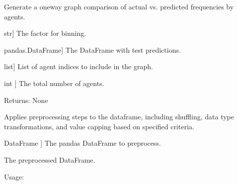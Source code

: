 \documentclass[letterpaper,10pt,english]{sphinxmanual}
\begin{document}
\begin{fulllineitems}
\label{\detokenize{utils:utils.one_way_graph_comparison}}
\pysigstartsignatures
{}
\pysigstopsignatures
\sphinxAtStartPar
Generate a one\sphinxhyphen{}way graph comparison of actual vs. predicted frequencies by agents.
\begin{description}
\begin{description}
\sphinxlineitem{factor}{[}str{]}
\sphinxAtStartPar
The factor for binning.

\sphinxlineitem{df\_test\_pred}{[}pandas.DataFrame{]}
\sphinxAtStartPar
The DataFrame with test predictions.

\sphinxlineitem{agents\_to\_graph\_list}{[}list{]}
\sphinxAtStartPar
List of agent indices to include in the graph.

\sphinxlineitem{NUM\_AGENTS}{[}int {]}
\sphinxAtStartPar
The total number of agents.

\end{description}

\end{description}

\sphinxAtStartPar
Returns:
None

\end{fulllineitems}


\begin{fulllineitems}
\label{\detokenize{utils:utils.preprocess_dataframe}}
\pysigstartsignatures
{}
\pysigstopsignatures
\sphinxAtStartPar
Applies preprocessing steps to the dataframe, including shuffling, data type transformations,
and value capping based on specified criteria.
\begin{description}
\begin{description}
\sphinxlineitem{df}{[}DataFrame {]}
\sphinxAtStartPar
The pandas DataFrame to preprocess.

\end{description}

\begin{description}
\sphinxAtStartPar
The preprocessed DataFrame.

\end{description}

\end{description}

\sphinxAtStartPar
Usage:

\end{fulllineitems}
\end{document}
